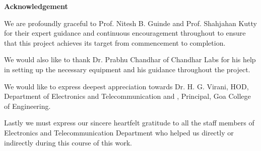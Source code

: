 \begin{center}
\begin{huge}
\bfseries{Acknowledgement}\\
\end{huge}
\end{center}
\vspace{1cm}
We are profoundly graceful to Prof. Nitesh B. Guinde and Prof. Shahjahan Kutty for their expert guidance and continuous encouragement throughout to ensure that this project achieves its target from commencement to completion.

\noindent We would also like to thank Dr. Prabhu Chandhar of Chandhar Labs for his help in setting up the necessary equipment and his guidance throughout the project.

\noindent We would like to express deepest appreciation towards Dr. H. G. Virani, HOD, Department of Electronics and Telecommunication and , Principal, Goa College of Engineering.

\noindent Lastly we must express our sincere heartfelt gratitude to all the staff members of Electronics and Telecommunication Department who helped us directly or indirectly during this course of this work.
